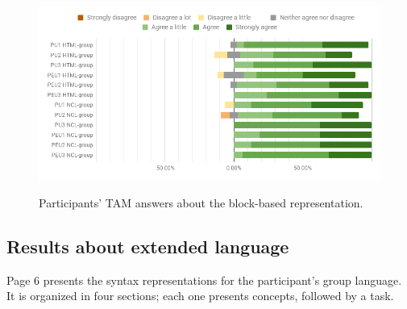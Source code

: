 \begin{figure}[!ht]
\begin{center}
	\includegraphics[width=14cm, keepaspectratio]{img/img22.png}
    \captionvspace
	\caption{Participants’ TAM answers about the block-based representation.}
    \captionvspace
	\label{fig:blocks-res3}
\end{center}
\end{figure}

\subsection{Results about extended language}
\label{sec:evaluation:lang-res}

Page 6 presents the syntax representations for the participant’s group language.
It is organized in four sections; each one presents concepts, followed by a
task.

